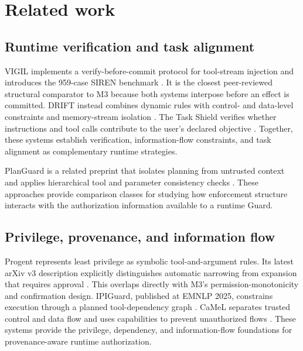 \section{Related work}

\label{sec:related-work}

\subsection{Runtime verification and task alignment}

\label{sec:related-work-runtime-verification-and-task-alignment}

VIGIL implements a verify-before-commit protocol for tool-stream injection and introduces the 959-case SIREN benchmark \citep{L01}. It is the closest peer-reviewed structural comparator to M3 because both systems interpose before an effect is committed. DRIFT instead combines dynamic rules with control- and data-level constraints and memory-stream isolation \citep{L02}. The Task Shield verifies whether instructions and tool calls contribute to the user's declared objective \citep{L03}. Together, these systems establish verification, information-flow constraints, and task alignment as complementary runtime strategies.

PlanGuard is a related preprint that isolates planning from untrusted context and applies hierarchical tool and parameter consistency checks \citep{L23}. These approaches provide comparison classes for studying how enforcement structure interacts with the authorization information available to a runtime Guard.

\subsection{Privilege, provenance, and information flow}

\label{sec:related-work-privilege-provenance-and-information-flow}

Progent represents least privilege as symbolic tool-and-argument rules. Its latest arXiv v3 description explicitly distinguishes automatic narrowing from expansion that requires approval \citep{L24}. This overlaps directly with M3's permission-monotonicity and confirmation design. IPIGuard, published at EMNLP 2025, constrains execution through a planned tool-dependency graph \citep{L25}. CaMeL separates trusted control and data flow and uses capabilities to prevent un\-au\-thor\-ized flows \citep{L26}. These systems provide the privilege, dependency, and information-flow foundations for provenance-aware runtime authorization.

